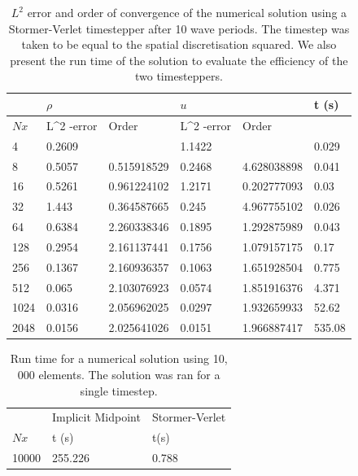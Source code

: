 \documentclass[a4paper,11pt]{article}
\begin{document}
\begin{table}[]
\centering
\caption{$L^2$ error and order of convergence of the numerical solution using a Stormer-Verlet timestepper after 10 wave periods. The timestep was taken to be equal to the spatial discretisation squared. We also present the run time of the solution to evaluate the efficiency of the two timesteppers.  }
\label{sverror}
\begin{tabular}{@{}llllll@{}}
\toprule
     & \multicolumn{2}{l}{$\rho$}               & \multicolumn{2}{l}{$u$}                  & t (s)  \\ \midrule
$Nx$ & L\textasciicircum 2 -error & Order       & L\textasciicircum 2 -error & Order       &        \\
 \toprule
4    & 0.2609                     &             & 1.1422                     &             & 0.029  \\
8    & 0.5057                     & 0.515918529 & 0.2468                     & 4.628038898 & 0.041  \\
16   & 0.5261                     & 0.961224102 & 1.2171                     & 0.202777093 & 0.03   \\
32   & 1.443                      & 0.364587665 & 0.245                      & 4.967755102 & 0.026  \\
64   & 0.6384                     & 2.260338346 & 0.1895                     & 1.292875989 & 0.043  \\
128  & 0.2954                     & 2.161137441 & 0.1756                     & 1.079157175 & 0.17   \\
256  & 0.1367                     & 2.160936357 & 0.1063                     & 1.651928504 & 0.775  \\
512  & 0.065                      & 2.103076923 & 0.0574                     & 1.851916376 & 4.371  \\
1024 & 0.0316                     & 2.056962025 & 0.0297                     & 1.932659933 & 52.62  \\
2048 & 0.0156                     & 2.025641026 & 0.0151                     & 1.966887417 & 535.08 \\ \bottomrule
\end{tabular}
\end{table}




\begin{table}[]
\centering
\caption{Run time for a numerical solution using 10, 000 elements. The solution was ran for a single timestep. }
\label{stresstest}
\begin{tabular}{@{}lll@{}}
      & Implicit Midpoint & Stormer-Verlet \\
$Nx$  & t (s)             & t(s)           \\
10000 & 255.226           & 0.788         
\end{tabular}
\end{table}
\end{document}

